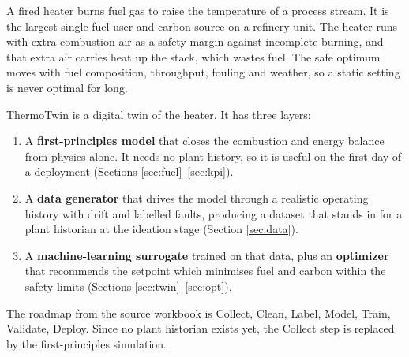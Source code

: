 \documentclass[11pt,a4paper]{article}
\begin{document}
A fired heater burns fuel gas to raise the temperature of a process stream. It is
the largest single fuel user and carbon source on a refinery unit. The heater
runs with extra combustion air as a safety margin against incomplete burning, and
that extra air carries heat up the stack, which wastes fuel. The safe optimum
moves with fuel composition, throughput, fouling and weather, so a static setting
is never optimal for long.

ThermoTwin is a digital twin of the heater. It has three layers:

\begin{enumerate}[leftmargin=1.4em]
  \item A \textbf{first-principles model} that closes the combustion and energy
        balance from physics alone. It needs no plant history, so it is useful on
        the first day of a deployment (Sections \ref{sec:fuel}--\ref{sec:kpi}).
  \item A \textbf{data generator} that drives the model through a realistic
        operating history with drift and labelled faults, producing a dataset
        that stands in for a plant historian at the ideation stage
        (Section \ref{sec:data}).
  \item A \textbf{machine-learning surrogate} trained on that data, plus an
        \textbf{optimizer} that recommends the setpoint which minimises fuel and
        carbon within the safety limits (Sections \ref{sec:twin}--\ref{sec:opt}).
\end{enumerate}

The roadmap from the source workbook is Collect, Clean, Label, Model, Train,
Validate, Deploy. Since no plant historian exists yet, the Collect step is
replaced by the first-principles simulation.
\end{document}
